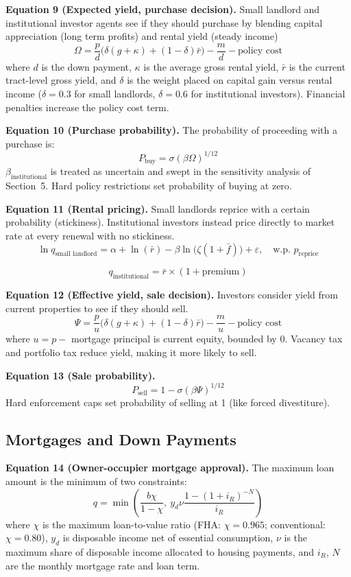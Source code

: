 \documentclass[twocolumn,showpacs,%
  nofootinbib,aps,superscriptaddress,%
  eqsecnum,prd,notitlepage,showkeys,10pt]{revtex4-1}
\begin{document}
\textbf{Equation 9 (Expected yield, purchase decision).} Small landlord and institutional investor agents see if they should purchase by blending capital appreciation (long term profits) and rental yield (steady income)
$$
\Omega = \frac{p}{d}\big(\delta(g+\kappa) + (1-\delta)\bar{r}\big) - \frac{m}{d} - \text{policy cost}
$$
where $d$ is the down payment, $\kappa$ is the average gross rental yield, $\bar{r}$ is the current tract-level gross yield, and $\delta$ is the weight placed on capital gain versus rental income ($\delta = 0.3$ for small landlords, $\delta = 0.6$ for institutional investors). Financial penalties increase the policy cost term. 
 
\textbf{Equation 10 (Purchase probability).} The probability of proceeding with a purchase is:
$$
P_{\text{buy}} = \sigma(\beta \Omega)^{1/12}
$$
 $\beta_{\text{institutional}}$ is treated as uncertain and swept in the sensitivity analysis of Section~5. Hard policy restrictions set probability of buying at zero. 
 
\textbf{Equation 11 (Rental pricing).} Small landlords reprice with a certain probability (stickiness). Institutional investors instead price directly to market rate at every renewal with no stickiness.
$$
\ln q_{\text{small landlord}} = \alpha + \ln(\bar{r}) - \beta \ln\big(\zeta(1+\bar{f})\big) + \varepsilon, \quad \text{w.p. } p_{\text{reprice}}
$$

$$
q_{\text{institutional}} = \bar{r} \times (1 + \text{premium})
$$

 
\textbf{Equation 12 (Effective yield, sale decision).} Investors consider yield from current properties to see if they should sell.
$$
\Psi = \frac{p}{u}\big(\delta(g+\kappa) + (1-\delta)\bar{r}\big) - \frac{m}{u} - \text{policy cost}
$$
where $u = p - $ mortgage principal is current equity, bounded by 0. Vacancy tax and portfolio tax reduce yield, making it more likely to sell. 
 
\textbf{Equation 13 (Sale probability).}
$$
P_{\text{sell}} = 1 - \sigma(\beta \Psi)^{1/12}
$$
Hard enforcement caps set probability of selling at 1 (like forced divestiture). 
 
\subsection{Mortgages and Down Payments}
 
\textbf{Equation 14 (Owner-occupier mortgage approval).} The maximum loan amount is the minimum of two constraints:
$$
q = \min\left( \frac{b\chi}{1-\chi},\ y_d \nu \frac{1-(1+i_R)^{-N}}{i_R} \right)
$$
where $\chi$ is the maximum loan-to-value ratio (FHA: $\chi = 0.965$; conventional: $\chi = 0.80$), $y_d$ is disposable income net of essential consumption, $\nu$ is the maximum share of disposable income allocated to housing payments, and $i_R$, $N$ are the monthly mortgage rate and loan term. 
 
\end{document}
